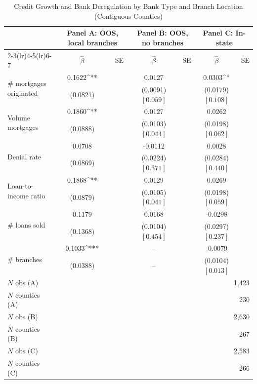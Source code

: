 \begin{table}[htbp]
\centering
\caption{Credit Growth and Bank Deregulation by Bank Type and Branch Location (Contiguous Counties)}
\label{tab:bank_location_branches_contig}
\small
\begin{tabular}{lcccccc}
\toprule
 & \multicolumn{2}{c}{Panel A: OOS, local branches} & \multicolumn{2}{c}{Panel B: OOS, no branches} & \multicolumn{2}{c}{Panel C: In-state} \\
\cmidrule(lr){2-3}\cmidrule(lr){4-5}\cmidrule(lr){6-7}
 & $\hat\beta$ & SE & $\hat\beta$ & SE & $\hat\beta$ & SE \\
\midrule
\multirow{2}{*}{\# mortgages originated} & 0.1622^{**} &  & 0.0127 &  & 0.0303^{*} &  \\
 & (0.0821) &  & (0.0091) $[0.059]$ &  & (0.0179) $[0.108]$ &  \\[2pt]
\multirow{2}{*}{Volume mortgages} & 0.1860^{**} &  & 0.0127 &  & 0.0262 &  \\
 & (0.0888) &  & (0.0103) $[0.044]$ &  & (0.0198) $[0.062]$ &  \\[2pt]
\multirow{2}{*}{Denial rate} & 0.0708 &  & -0.0112 &  & 0.0028 &  \\
 & (0.0869) &  & (0.0224) $[0.371]$ &  & (0.0284) $[0.440]$ &  \\[2pt]
\multirow{2}{*}{Loan-to-income ratio} & 0.1868^{**} &  & 0.0129 &  & 0.0269 &  \\
 & (0.0879) &  & (0.0105) $[0.041]$ &  & (0.0198) $[0.059]$ &  \\[2pt]
\multirow{2}{*}{\# loans sold} & 0.1179 &  & 0.0168 &  & -0.0298 &  \\
 & (0.1368) &  & (0.0104) $[0.454]$ &  & (0.0297) $[0.237]$ &  \\[2pt]
\multirow{2}{*}{\# branches} & 0.1033^{***} &  & -- &  & -0.0079 &  \\
 & (0.0388) &  & -- &  & (0.0104) $[0.013]$ &  \\[2pt]
\midrule
$N$ obs (A) & \multicolumn{6}{r}{1,423} \\
$N$ counties (A) & \multicolumn{6}{r}{230} \\
$N$ obs (B) & \multicolumn{6}{r}{2,630} \\
$N$ counties (B) & \multicolumn{6}{r}{267} \\
$N$ obs (C) & \multicolumn{6}{r}{2,583} \\
$N$ counties (C) & \multicolumn{6}{r}{266} \\
\bottomrule
\end{tabular}
\begin{tablenotes}

\end{tablenotes}
\end{table}
